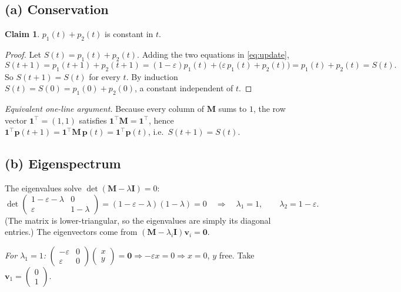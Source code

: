 \documentclass[12pt,a4paper]{article}
\theoremstyle{definition}
\newtheorem*{claim}{Claim}
\newcommand{\Mx}{\mathbf{M}}
\newcommand{\vv}{\mathbf{v}}
\newcommand{\pp}{\mathbf{p}}
\newcommand{\zero}{\mathbf{0}}
\newcommand{\T}{^{\!\top}}
\begin{document}
\subsection{(a) Conservation}

\begin{claim}
$p_1(t)+p_2(t)$ is constant in $t$.
\end{claim}
\begin{proof}
Let $S(t)=p_1(t)+p_2(t)$. Adding the two equations in \eqref{eq:update},
\[
S(t+1)=p_1(t+1)+p_2(t+1)=(1-\varepsilon)p_1(t)+\bigl(\varepsilon\,p_1(t)+p_2(t)\bigr)
       = p_1(t)+p_2(t)=S(t).
\]
So $S(t+1)=S(t)$ for every $t$. By induction $S(t)=S(0)=p_1(0)+p_2(0)$, a
constant independent of $t$. \end{proof}

\textit{Equivalent one-line argument.} Because every column of $\Mx$ sums to
$1$, the row vector $\mathbf{1}\T=(1,1)$ satisfies $\mathbf{1}\T\Mx=\mathbf{1}\T$,
hence $\mathbf{1}\T\pp(t+1)=\mathbf{1}\T\Mx\,\pp(t)=\mathbf{1}\T\pp(t)$, i.e.\
$S(t+1)=S(t)$.

\subsection{(b) Eigenspectrum}

The eigenvalues solve $\det(\Mx-\lambda \mathbf I)=0$:
\[
\det\!\begin{pmatrix}1-\varepsilon-\lambda & 0\\[2pt] \varepsilon & 1-\lambda\end{pmatrix}
=(1-\varepsilon-\lambda)(1-\lambda)=0
\quad\Longrightarrow\quad
\boxed{\lambda_1=1,\qquad \lambda_2=1-\varepsilon.}
\]
(The matrix is lower-triangular, so the eigenvalues are simply its diagonal
entries.) The eigenvectors come from $(\Mx-\lambda_i\mathbf I)\vv_i=\zero$.

\textit{For $\lambda_1=1$:}\quad
$\begin{pmatrix}-\varepsilon & 0\\ \varepsilon & 0\end{pmatrix}\!\begin{pmatrix}x\\ y\end{pmatrix}=\zero
\Rightarrow -\varepsilon x=0\Rightarrow x=0$, $y$ free. Take
$\displaystyle \vv_1=\begin{pmatrix}0\\1\end{pmatrix}.$
\end{document}
